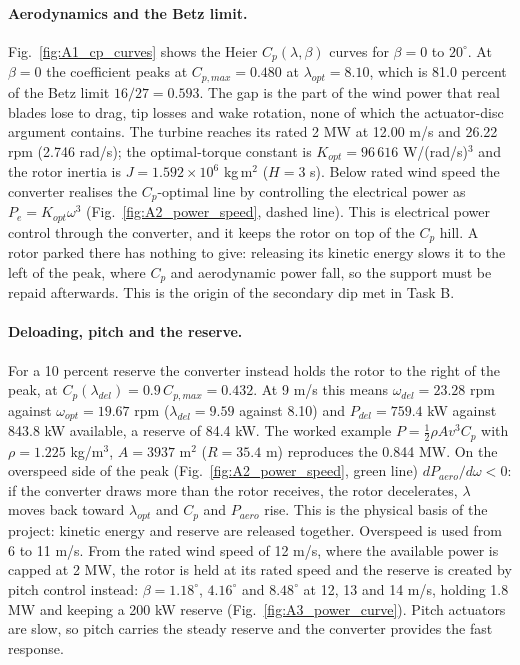 \paragraph{Aerodynamics and the Betz limit.} Fig.~\ref{fig:A1_cp_curves} shows the Heier $C_p(\lambda,\beta)$ curves for $\beta=0$ to $20^\circ$. At $\beta=0$ the coefficient peaks at $C_{p,max}=0.480$ at $\lambda_{opt}=8.10$, which is 81.0 percent of the Betz limit $16/27=0.593$. The gap is the part of the wind power that real blades lose to drag, tip losses and wake rotation, none of which the actuator-disc argument contains. The turbine reaches its rated 2 MW at 12.00 m/s and 26.22 rpm (2.746 rad/s); the optimal-torque constant is $K_{opt}=96\,616$ W/(rad/s)$^3$ and the rotor inertia is $J=1.592\times10^{6}$ kg\,m$^2$ ($H=3$ s). Below rated wind speed the converter realises the $C_p$-optimal line by controlling the electrical power as $P_e=K_{opt}\omega^3$ (Fig.~\ref{fig:A2_power_speed}, dashed line). This is electrical power control through the converter, and it keeps the rotor on top of the $C_p$ hill. A rotor parked there has nothing to give: releasing its kinetic energy slows it to the left of the peak, where $C_p$ and aerodynamic power fall, so the support must be repaid afterwards. This is the origin of the secondary dip met in Task B.

\paragraph{Deloading, pitch and the reserve.} For a 10 percent reserve the converter instead holds the rotor to the right of the peak, at $C_p(\lambda_{del})=0.9\,C_{p,max}=0.432$. At 9 m/s this means $\omega_{del}=23.28$ rpm against $\omega_{opt}=19.67$ rpm ($\lambda_{del}=9.59$ against 8.10) and $P_{del}=759.4$ kW against 843.8 kW available, a reserve of 84.4 kW. The worked example $P=\tfrac12\rho A v^3C_p$ with $\rho=1.225$ kg/m$^3$, $A=3937$ m$^2$ ($R=35.4$ m) reproduces the 0.844 MW. On the overspeed side of the peak (Fig.~\ref{fig:A2_power_speed}, green line) $dP_{aero}/d\omega<0$: if the converter draws more than the rotor receives, the rotor decelerates, $\lambda$ moves back toward $\lambda_{opt}$ and $C_p$ and $P_{aero}$ rise. This is the physical basis of the project: kinetic energy and reserve are released together. Overspeed is used from 6 to 11 m/s. From the rated wind speed of 12 m/s, where the available power is capped at 2 MW, the rotor is held at its rated speed and the reserve is created by pitch control instead: $\beta=1.18^\circ$, $4.16^\circ$ and $8.48^\circ$ at 12, 13 and 14 m/s, holding 1.8 MW and keeping a 200 kW reserve (Fig.~\ref{fig:A3_power_curve}). Pitch actuators are slow, so pitch carries the steady reserve and the converter provides the fast response.

